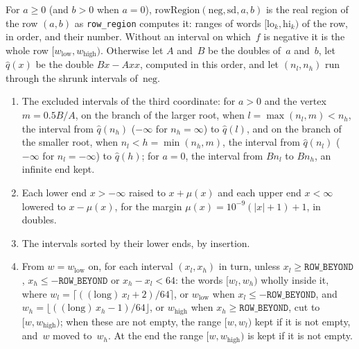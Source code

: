 \begin{definition}\label{def:rowRegion}
  \leanok
  For $a \ge 0$ (and $b > 0$ when $a = 0$), $\mathrm{rowRegion}(\mathrm{neg}, \mathrm{sd}, a, b)$ is
  the real region of the row $(a, b)$ as \texttt{row\_region} computes it: ranges of words
  $[\mathrm{lo}_k, \mathrm{hi}_k)$ of the row, in order, and their number. Without an interval on
  which~$f$ is negative it is the whole row $[w_{\mathrm{low}}, w_{\mathrm{high}})$. Otherwise let
  $A$ and~$B$ be the doubles of~$a$ and~$b$, let $\widehat{q}(x)$ be the double $B x - A x x$,
  computed in this order, and let $(n_l, n_h)$ run through the shrunk intervals of~$\mathrm{neg}$.
  \begin{enumerate}
    \item The excluded intervals of the third coordinate: for $a > 0$ and the vertex
      $m = 0.5 B / A$, on the branch of the larger root, when $l = \max(n_l, m) < n_h$, the interval
      from $\widehat{q}(n_h)$ ($-\infty$ for $n_h = \infty$) to $\widehat{q}(l)$, and on the branch
      of the smaller root, when $n_l < h = \min(n_h, m)$, the interval from $\widehat{q}(n_l)$
      ($-\infty$ for $n_l = -\infty$) to $\widehat{q}(h)$; for $a = 0$, the interval from $B n_l$
      to $B n_h$, an infinite end kept.
    \item Each lower end $x > -\infty$ raised to $x + \mu(x)$ and each upper end $x < \infty$
      lowered to $x - \mu(x)$, for the margin $\mu(x) = 10^{-9}(|x| + 1) + 1$, in doubles.
    \item The intervals sorted by their lower ends, by insertion.
    \item From $w = w_{\mathrm{low}}$ on, for each interval $(x_l, x_h)$ in turn, unless
      $x_l \ge \mathtt{ROW\_BEYOND}$, $x_h \le -\mathtt{ROW\_BEYOND}$ or $x_h - x_l < 64$: the words
      $[w_l, w_h)$ wholly inside it, where $w_l = \lceil ((\mathrm{long})\,x_l + 2)/64 \rceil$, or
      $w_{\mathrm{low}}$ when $x_l \le -\mathtt{ROW\_BEYOND}$, and
      $w_h = \lfloor ((\mathrm{long})\,x_h - 1)/64 \rfloor$, or $w_{\mathrm{high}}$ when
      $x_h \ge \mathtt{ROW\_BEYOND}$, cut to $[w, w_{\mathrm{high}})$; when these are not empty,
      the range $[w, w_l)$ kept if it is not empty, and~$w$ moved to~$w_h$. At the end the range
      $[w, w_{\mathrm{high}})$ is kept if it is not empty.
  \end{enumerate}
\end{definition}

